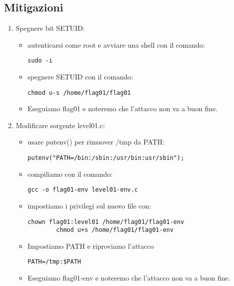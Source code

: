 \subsection{Mitigazioni}
\begin{enumerate}
    \item Spegnere bit SETUID:
    \begin{itemize}
        \item autenticarsi come root e avviare una shell con il comando: \begin{lstlisting}[style=bashstyle] 
        sudo -i
        \end{lstlisting}
        \item spegnere SETUID con il comando: \begin{lstlisting}[style=bashstyle] 
        chmod u-s /home/flag01/flag01
        \end{lstlisting}   
        \item Eseguiamo flag01 e noteremo che l'attacco non va a buon fine. 
    \end{itemize}
    \item Modificare sorgente level01.c:
    \begin{itemize}
        \item usare putenv() per rimuover /tmp da PATH:
        \begin{lstlisting}[style=cstyle]
        putenv("PATH=/bin:/sbin:/usr/bin:usr/sbin");
        \end{lstlisting}
        \item compiliamo con il comando:
        \begin{lstlisting}[style=bashstyle]
        gcc -o flag01-env level01-env.c
        \end{lstlisting}
        \item impostiamo i privilegi sul nuovo file con:
        \begin{lstlisting}[style=bashstyle]
        chown flag01:level01 /home/flag01/flag01-env 
        chmod u+s /home/flag01/flag01-env   
        \end{lstlisting}
        \item Impostiamo PATH e riproviamo l'attacco
        \begin{lstlisting}[style=bashstyle]
        PATH=/tmp:$PATH  
        \end{lstlisting} 
        \item Eseguiamo flag01-env e noteremo che l’attacco non va a buon fine.
    \end{itemize}   
\end{enumerate}


